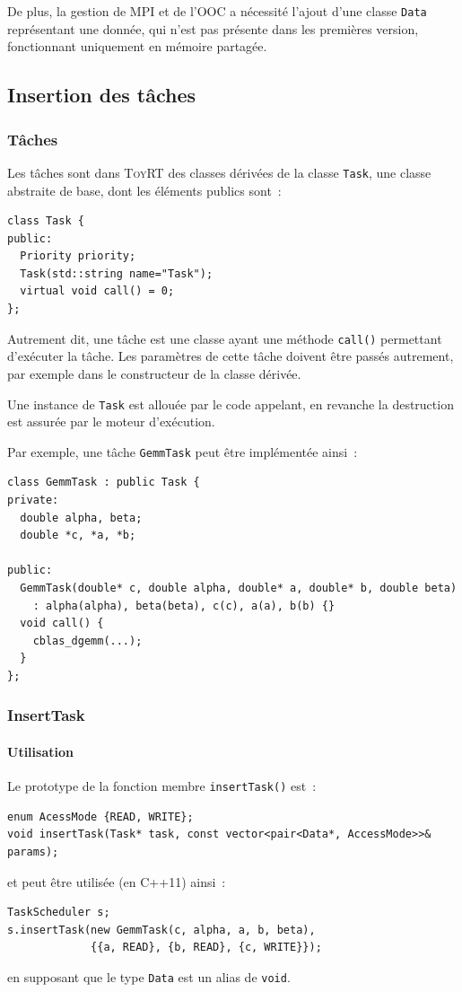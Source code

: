 \documentclass[11pt]{article}
\theoremstyle{plain} %
\theoremstyle{definition} %
\begin{document}
De plus, la gestion de MPI et de l'OOC a nécessité l'ajout d'une classe \texttt{Data} représentant une donnée, qui n'est pas présente dans les premières version, fonctionnant uniquement en mémoire partagée.

\subsection{Insertion des tâches}
\label{sec:insertion-des-taches}

\subsubsection{Tâches}
\label{sec:taches}
Les tâches sont dans \textsc{ToyRT} des classes dérivées de la classe \texttt{Task}, une classe abstraite de base, dont les éléments publics sont~:~
\begin{lstlisting}
class Task {
public:
  Priority priority;
  Task(std::string name="Task");
  virtual void call() = 0;
};
\end{lstlisting}
Autrement dit, une tâche est une classe ayant une méthode \texttt{call()} permettant d'exécuter la tâche.
Les paramètres de cette tâche doivent être passés autrement, par exemple dans le constructeur de la classe dérivée.

Une instance de \texttt{Task} est allouée par le code appelant, en revanche la destruction est assurée par le moteur d'exécution.

Par exemple, une tâche \texttt{GemmTask} peut être implémentée ainsi~:
\begin{lstlisting}
class GemmTask : public Task {
private:
  double alpha, beta;
  double *c, *a, *b;

public:
  GemmTask(double* c, double alpha, double* a, double* b, double beta)
    : alpha(alpha), beta(beta), c(c), a(a), b(b) {}
  void call() {
    cblas_dgemm(...);
  }
};
\end{lstlisting}

\subsubsection{InsertTask}
\label{sec:inserttask}

\paragraph{Utilisation}
\label{sec:utilisation}
Le prototype de la fonction membre \texttt{insertTask()} est~:~
\begin{lstlisting}
enum AcessMode {READ, WRITE};
void insertTask(Task* task, const vector<pair<Data*, AccessMode>>& params);
\end{lstlisting}
et peut être utilisée (en C++11) ainsi~:
\begin{lstlisting}
TaskScheduler s;
s.insertTask(new GemmTask(c, alpha, a, b, beta),
             {{a, READ}, {b, READ}, {c, WRITE}});
\end{lstlisting}
en supposant que le type \texttt{Data} est un alias de \texttt{void}.
\end{document}
